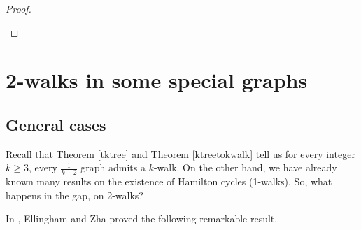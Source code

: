 \documentclass[12pt]{report}
\begin{document}
\begin{proof}
\begin{figure}[h]
\begin{center}

\end{center}
\end{figure}


\end{proof}












































\newpage

\section{2-walks in some special graphs}

\subsection{General cases}
Recall that Theorem \ref{tktree} and Theorem \ref{ktreetokwalk} tell us  for every integer $k\ge3$, every $\frac{1}{k-2}$ graph admits a $k$-walk. On the other hand, we have already known many results on the existence of Hamilton cycles (1-walks). So, what happens in the gap, on 2-walks?

In \cite{ellingham2000toughness}, Ellingham and Zha proved the following remarkable result.
\end{document}
